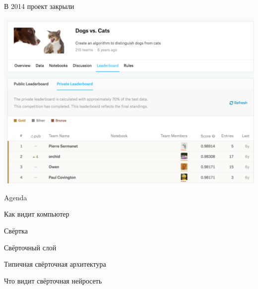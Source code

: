 \documentclass[notes,12pt, aspectratio=169]{beamer}
\newenvironment{wideitemize}{\itemize\addtolength{\itemsep}{10pt}}{\enditemize}
\begin{document}
\begin{frame}{В 2014 проект закрыли}
\begin{center}
	\includegraphics[width=.75\linewidth]{dogs_vs_cat.png}
\end{center}
\end{frame}



\begin{frame}{Agenda}
\begin{wideitemize}
	\item Как видит компьютер
	\item Свёртка
	\item Свёрточный слой
	\item Типичная свёрточная архитектура
	\item Что видит свёрточная нейросеть
\end{wideitemize} 
\end{frame}
\end{document}
